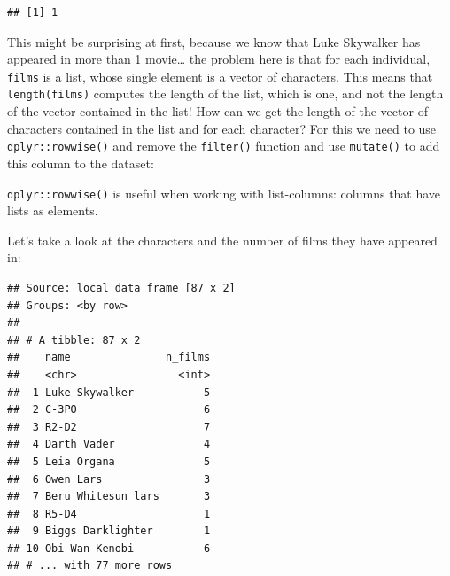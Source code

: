 \documentclass[]{gitbook}
\newenvironment{Shaded}{\begin{snugshade}}{\end{snugshade}}
\newcommand{\DataTypeTok}[1]{\textcolor[rgb]{0.13,0.29,0.53}{#1}}
\newcommand{\KeywordTok}[1]{\textcolor[rgb]{0.13,0.29,0.53}{\textbf{#1}}}
\newcommand{\NormalTok}[1]{#1}
\newcommand{\OperatorTok}[1]{\textcolor[rgb]{0.81,0.36,0.00}{\textbf{#1}}}
\newcommand{\StringTok}[1]{\textcolor[rgb]{0.31,0.60,0.02}{#1}}
\theoremstyle{definition}
\theoremstyle{definition}
\theoremstyle{definition}
\theoremstyle{remark}
\begin{document}
\begin{verbatim}
## [1] 1
\end{verbatim}

This might be surprising at first, because we know that Luke Skywalker
has appeared in more than 1 movie\ldots{} the problem here is that for
each individual, \texttt{films} is a list, whose single element is a
vector of characters. This means that \texttt{length(films)} computes
the length of the list, which is one, and not the length of the vector
contained in the list! How can we get the length of the vector of
characters contained in the list and for each character? For this we
need to use \texttt{dplyr::rowwise()} and remove the \texttt{filter()}
function and use \texttt{mutate()} to add this column to the dataset:

\begin{Shaded}
\end{Shaded}

\texttt{dplyr::rowwise()} is useful when working with list-columns:
columns that have lists as elements.

Let's take a look at the characters and the number of films they have
appeared in:

\begin{Shaded}
\end{Shaded}

\begin{verbatim}
## Source: local data frame [87 x 2]
## Groups: <by row>
## 
## # A tibble: 87 x 2
##    name               n_films
##    <chr>                <int>
##  1 Luke Skywalker           5
##  2 C-3PO                    6
##  3 R2-D2                    7
##  4 Darth Vader              4
##  5 Leia Organa              5
##  6 Owen Lars                3
##  7 Beru Whitesun lars       3
##  8 R5-D4                    1
##  9 Biggs Darklighter        1
## 10 Obi-Wan Kenobi           6
## # ... with 77 more rows
\end{verbatim}
\end{document}
